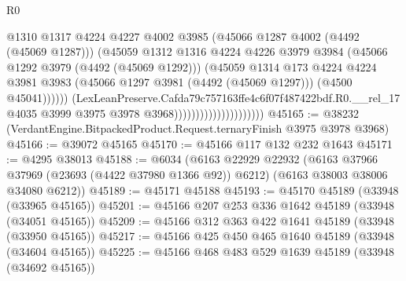 \begin{lexlean}{R0}
\begin{coremodule}
                                                  @1310
                                                  @1317
                                                  @4224
                                                  @4227
                                                  @4002
                                                  @3985
                                                  (@45066 @1287 @4002 (@4492 (@45069 @1287)))
                                                  (@45059
                                                    @1312
                                                    @1316
                                                    @4224
                                                    @4226
                                                    @3979
                                                    @3984
                                                    (@45066 @1292 @3979 (@4492 (@45069 @1292)))
                                                    (@45059
                                                      @1314
                                                      @173
                                                      @4224
                                                      @4224
                                                      @3981
                                                      @3983
                                                      (@45066 @1297 @3981 (@4492 (@45069 @1297)))
                                                      (@4500 @45041))))))
                                            (LexLeanPreserve.Cafda79c757163ffe4c6f07f487422bdf.R0.__rel_17
                                              @4035
                                              @3999
                                              @3975
                                              @3978
                                              @3968)))))))))))))))))))))
@45165 := @38232 (VerdantEngine.BitpackedProduct.Request.ternaryFinish @3975 @3978 @3968)
@45166 := @39072 @45165
@45170 := @45166 @117 @132 @232 @1643
@45171 := @4295 @38013
@45188 := @6034
    (@6163
      @22929
      @22932
      (@6163 @37966 @37969 (@23693 (@4422 @37980 @1366 @92)) @6212)
      (@6163 @38003 @38006 @34080 @6212))
@45189 := @45171 @45188
@45193 := @45170 @45189 (@33948 (@33965 @45165))
@45201 := @45166 @207 @253 @336 @1642 @45189 (@33948 (@34051 @45165))
@45209 := @45166 @312 @363 @422 @1641 @45189 (@33948 (@33950 @45165))
@45217 := @45166 @425 @450 @465 @1640 @45189 (@33948 (@34604 @45165))
@45225 := @45166 @468 @483 @529 @1639 @45189 (@33948 (@34692 @45165))

\end{coremodule}
\end{lexlean}
